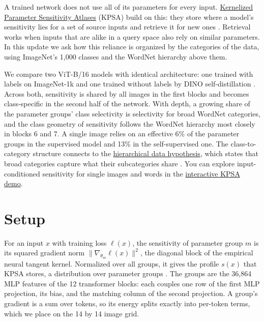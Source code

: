 \documentclass[11pt]{article}
\begin{document}

\begin{publicationhead}
\makepublicationtitle
\end{publicationhead}

A trained network does not use all of its parameters for every input. \href{https://axym.org/work/kpsa/}{Kernelized Parameter Sensitivity Atlases} (KPSA) build on this: they store where a model's sensitivity lies for a set of source inputs and retrieve it for new ones \cite{kpsa}. Retrieval works when inputs that are alike in a query space also rely on similar parameters. In this update we ask how this reliance is organized by the categories of the data, using ImageNet's 1,000 classes and the WordNet hierarchy above them.

We compare two ViT-B/16 models with identical architecture: one trained with labels on ImageNet-1k and one trained without labels by DINO self-distillation \cite{steiner2022,caron2021}. Across both, sensitivity is shared by all images in the first blocks and becomes class-specific in the second half of the network. With depth, a growing share of the parameter groups' class selectivity is selectivity for broad WordNet categories, and the class geometry of sensitivity follows the WordNet hierarchy most closely in blocks 6 and 7. A single image relies on an effective 6\% of the parameter groups in the supervised model and 13\% in the self-supervised one. The class-to-category structure connects to the \href{https://axym.org/work/hierarchical-data-hypothesis/}{hierarchical data hypothesis}, which states that broad categories capture what their subcategories share \cite{hdh}. You can explore input-conditioned sensitivity for single images and words in the \href{https://axym.org/work/kpsa-demo/}{interactive KPSA demo}.

\section{Setup}\label{setup}

For an input \(x\) with training loss \(\ell(x)\), the sensitivity of parameter group \(m\) is its squared gradient norm \(\lVert\nabla_{\theta_m}\ell(x)\rVert^2\), the diagonal block of the empirical neural tangent kernel. Normalized over all groups, it gives the profile \(s(x)\) that KPSA stores, a distribution over parameter groups \cite{kpsa}. The groups are the 36,864 MLP features of the 12 transformer blocks: each couples one row of the first MLP projection, its bias, and the matching column of the second projection. A group's gradient is a sum over tokens, so its energy splits exactly into per-token terms, which we place on the 14 by 14 image grid.
\end{document}
